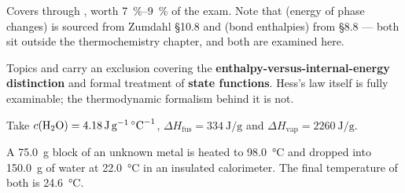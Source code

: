 \documentclass{apchem-exam}
\begin{document}
\apctitleblock

\begin{apcnote}[Scope]
Covers  through , worth
\SI{7}{\percent}--\SI{9}{\percent} of the exam. Note that 
(energy of phase changes) is sourced from Zumdahl \S10.8 and 
(bond enthalpies) from \S8.8 --- both sit outside the thermochemistry
chapter, and both are examined here.

Topics  and  carry an exclusion covering the
\textbf{enthalpy-versus-internal-energy distinction} and formal treatment
of \textbf{state functions}. Hess's law itself is fully examinable; the
thermodynamic formalism behind it is not.

Take $c(\ce{H2O}) = \SI{4.18}{\joule\per\gram\per\celsius}$,
$\Delta H_{\text{fus}} = \SI{334}{\joule\per\gram}$ and
$\Delta H_{\text{vap}} = \SI{2260}{\joule\per\gram}$.
\end{apcnote}



A \SI{75.0}{\gram} block of an unknown metal is heated to
\SI{98.0}{\celsius} and dropped into \SI{150.0}{\gram} of water at
\SI{22.0}{\celsius} in an insulated calorimeter. The final temperature of
both is \SI{24.6}{\celsius}.
\end{document}
